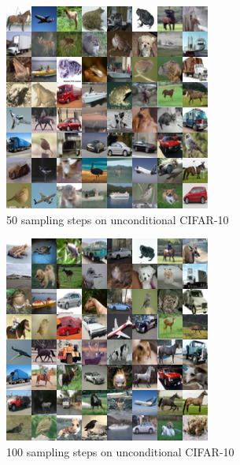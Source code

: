 \documentclass{article}
\begin{document}
\begin{figure}[h!]
    \centerline{\includegraphics[width=0.78\columnwidth]{samples_cifar_hybrid_50.png}}
    \caption{\label{fig:firstcifar} 50 sampling steps on unconditional CIFAR-10}
\end{figure}
\begin{figure}[h!]
    \centerline{\includegraphics[width=0.78\columnwidth]{samples_cifar_hybrid_100.png}}
    \caption{100 sampling steps on unconditional CIFAR-10}
\end{figure}
\end{document}
